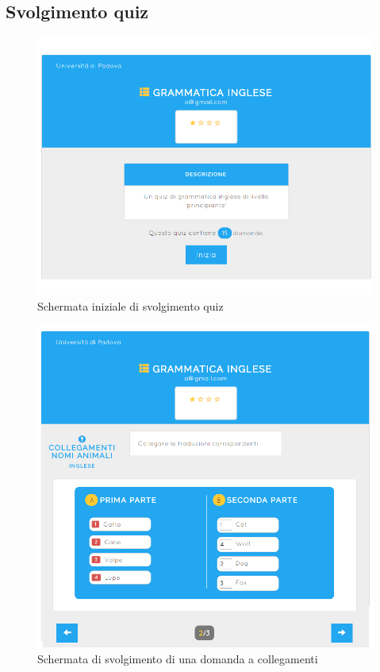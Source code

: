 \documentclass[a4paper, titlepage]{article}
\begin{document}
	 \subsection{Svolgimento quiz}
	 \begin{figure}[!h]
	 	\centering
	 	\includegraphics[scale=0.33]{Img/screen_SvolgimentoQuiz1.png}
	 	\caption{Schermata iniziale di svolgimento quiz}
	 \end{figure}
	 \begin{figure}[!h]
	 	\centering
	 	\includegraphics[scale=0.33]{Img/screen_SvolgimentoQuiz3.png}
	 	\caption{Schermata di svolgimento di una domanda a collegamenti}
	 \end{figure}
\end{document}
